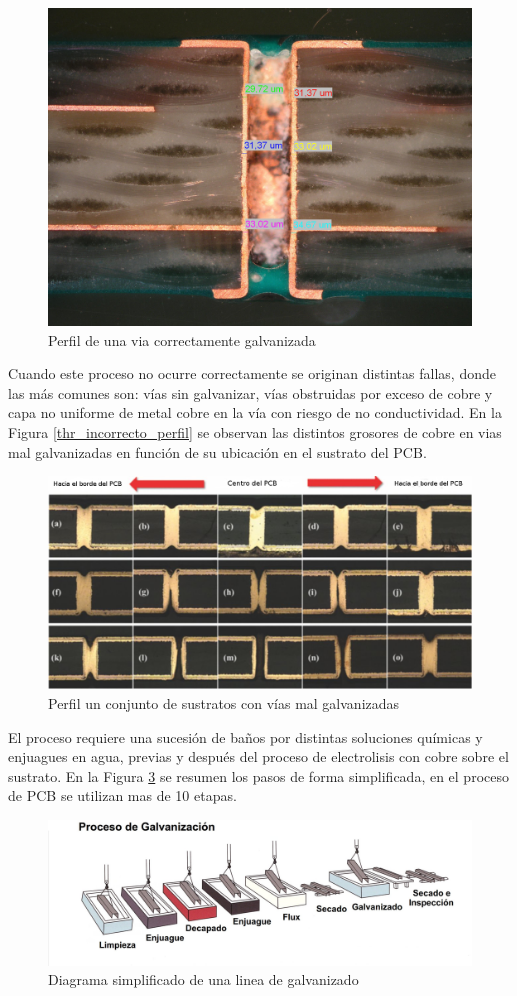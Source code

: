 \begin{figure}[h]
\centering
\includegraphics[width=.5\textwidth]{Figures/through_hole_perfil}
\caption{Perfil de una via correctamente galvanizada}
	\label{fig:thr_correcto_perfil}
\end{figure}

Cuando este proceso no ocurre correctamente se originan distintas fallas, donde las más comunes son: vías sin galvanizar, vías obstruidas por exceso de cobre y capa no uniforme de metal cobre en la vía con riesgo de no conductividad. En la Figura \ref{thr_incorrecto_perfil} se observan las distintos grosores de cobre en vias mal galvanizadas en función de su ubicación en el sustrato del PCB.

\begin{figure}[h]
	\centering
	\includegraphics[width=.8\textwidth]{Figures/through_hole_perfil_fallado}
	\caption{Perfil un conjunto de sustratos con vías mal galvanizadas}
	\label{fig:thr_incorrecto_perfil}
\end{figure}

El proceso requiere una sucesión de baños por distintas soluciones químicas y enjuagues en agua, previas y después del proceso de electrolisis con cobre sobre el sustrato. En la Figura \ref{fig:diagrama_proceso} se resumen los pasos de forma simplificada, en el proceso de PCB se utilizan mas de 10 etapas.

\begin{figure}[h]
	\centering
	\includegraphics[width=.8\textwidth]{Figures/diagrama_galvanizado_castellano}
	\caption{Diagrama simplificado de una linea de galvanizado}
	\label{fig:diagrama_proceso}
\end{figure}


